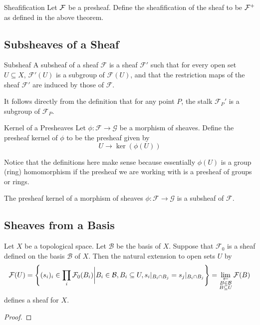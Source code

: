 \documentclass[a4paper]{article}
\begin{document}
\begin{defn}{Sheafification}{} Let $\mathcal{F}$ be a presheaf. Define the sheafification of the sheaf to be $\mathcal{F}^+$ as defined in the above theorem. 
\end{defn}


\subsection{Subsheaves of a Sheaf}
\begin{defn}{Subsheaf}{} A subsheaf of a sheaf $\mathcal{F}$ is a sheaf $\mathcal{F}'$ such that for every open set $U\subseteq X$, $\mathcal{F}'(U)$ is a subgroup of $\mathcal{F}(U)$, and that the restriction maps of the sheaf $\mathcal{F}'$ are induced by those of $\mathcal{F}$. 
\end{defn}

It follows directly from the definition that for any point $P$, the stalk $\mathcal{F}_P'$ is a subgroup of $\mathcal{F}_P$. 

\begin{defn}{Kernel of a Presheaves}{} Let $\phi:\mathcal{F}\to\mathcal{G}$ be a morphism of sheaves. Define the presheaf kernel of $\phi$ to be the presheaf given by $$U\to\ker(\phi(U))$$ 
\end{defn}

Notice that the definitions here make sense because essentially $\phi(U)$ is a group (ring) homomorphism if the presheaf we are working with is a presheaf of groups or rings. 

\begin{prp}{}{} The presheaf kernel of a morphism of sheaves $\phi:\mathcal{F}\to\mathcal{G}$ is a subsheaf of $\mathcal{F}$. 
\end{prp}

\subsection{Sheaves from a Basis}
\begin{thm}{}{} Let $X$ be a topological space. Let $\mathcal{B}$ be the basis of $X$. Suppose that $\mathcal{F}_0$ is a sheaf defined on the basis $\mathcal{B}$ of $X$. Then the natural extension to open sets $U$ by $$\mathcal{F}(U)=\left\{(s_i)_i\in\prod_i\mathcal{F}_0(B_i)\bigg{|}B_i\in\mathcal{B}, B_i\subseteq U, s_i|_{B_i\cap B_j}=s_j|_{B_i\cap B_j}\right\}=\lim_{\substack{\leftarrow\\B\in\mathcal{B}\\B\subseteq U}}\mathcal{F}(B)$$ defines a sheaf for $X$. \tcbline
\begin{proof}

\end{proof}
\end{thm}
\end{document}
